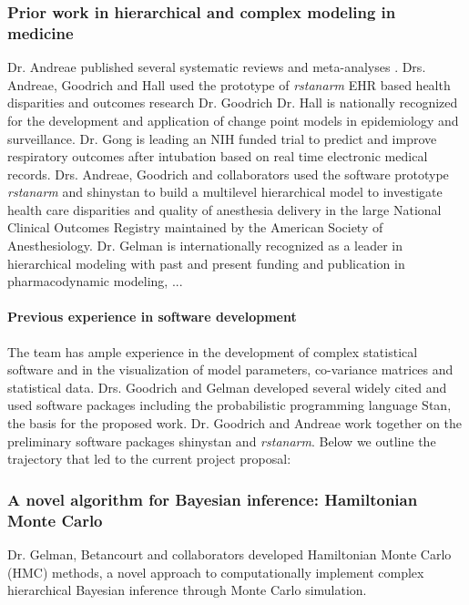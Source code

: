 \documentclass[11pt,notitlepage]{article}
\begin{document}
\subsubsection*{Prior work in hierarchical and complex modeling in medicine} Dr. Andreae published several systematic reviews and meta-analyses \cite{Andreae2013, Andreae2015, Carter2015}. Drs. Andreae, Goodrich and Hall used the prototype of \textit{rstanarm} EHR based health disparities and outcomes research \cite{AndreaeWhite2015} Dr. Goodrich Dr. Hall is nationally recognized for the development and application of change point models in epidemiology and surveillance. Dr. Gong is leading an NIH funded trial to predict and improve respiratory outcomes after intubation based on real time electronic medical records.  Drs. Andreae, Goodrich and collaborators used the software prototype \textit{rstanarm} and shinystan to build a multilevel hierarchical model to investigate health care disparities and quality of anesthesia delivery in the large National Clinical Outcomes Registry maintained by the American Society of Anesthesiology. Dr. Gelman is internationally recognized as a leader in hierarchical modeling with past and present funding and publication in pharmacodynamic modeling, ...

\paragraph*{Previous experience in software development} 
The team has ample experience in the development of complex statistical software and in the visualization of model parameters, co-variance matrices and statistical data.  Drs. Goodrich and Gelman developed several widely cited and used software packages including the probabilistic programming language Stan\cite{SDT2014}, the basis for the proposed work. Dr. Goodrich and Andreae work together on the preliminary software packages shinystan and \textit{rstanarm}. Below we outline the trajectory that led to the current project proposal:
\newline

\subsubsection*{A novel algorithm for Bayesian inference: Hamiltonian Monte Carlo}
Dr. Gelman, Betancourt and collaborators developed Hamiltonian Monte Carlo (HMC) methods, a novel approach to computationally implement complex hierarchical Bayesian inference through Monte Carlo simulation. 
\end{document}
